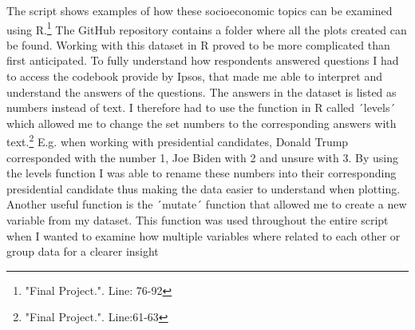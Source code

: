 \documentclass{article}
\begin{document}
The script shows examples of how these socioeconomic topics can be examined using R.\footnote{"Final Project.". Line: 76-92}  The GitHub repository contains a folder where all the plots created can be found.
Working with this dataset in R proved to be more complicated than first anticipated. To fully understand how respondents answered questions I had to access the codebook provide by Ipsos, that made me able to interpret and understand the answers of the questions. The answers in the dataset is listed as numbers instead of text. I therefore had to use the function in R called ´levels´ which allowed me to change the set numbers to the corresponding answers with text.\footnote{"Final Project.". Line:61-63}  E.g. when working with presidential candidates, Donald Trump corresponded with the number 1, Joe Biden with 2 and unsure with 3. By using the levels function I was able to rename these numbers into their corresponding presidential candidate thus making the data easier to understand when plotting. Another useful function is the ´mutate´ function that allowed me to create a new variable from my dataset. This function was used throughout the entire script when I wanted to examine how multiple variables where related to each other or group data for a clearer insight
\end{document}
